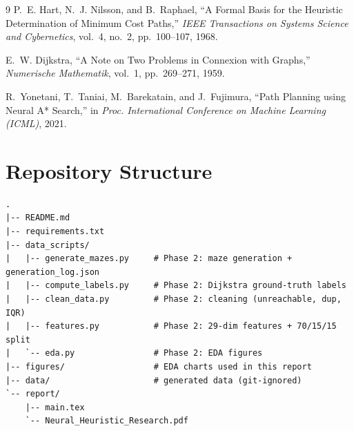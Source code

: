 \documentclass[11pt]{article}
\begin{document}
\begin{thebibliography}{9}
P.~E. Hart, N.~J. Nilsson, and B.~Raphael,
``A Formal Basis for the Heuristic Determination of Minimum Cost Paths,''
\emph{IEEE Transactions on Systems Science and Cybernetics}, vol.~4, no.~2, pp.~100--107, 1968.

E.~W. Dijkstra,
``A Note on Two Problems in Connexion with Graphs,''
\emph{Numerische Mathematik}, vol.~1, pp.~269--271, 1959.

R.~Yonetani, T.~Taniai, M.~Barekatain, and J.~Fujimura,
``Path Planning using Neural A* Search,''
in \emph{Proc. International Conference on Machine Learning (ICML)}, 2021.
\end{thebibliography}

\appendix


\section{Repository Structure}
\begin{verbatim}
.
|-- README.md
|-- requirements.txt
|-- data_scripts/
|   |-- generate_mazes.py     # Phase 2: maze generation + generation_log.json
|   |-- compute_labels.py     # Phase 2: Dijkstra ground-truth labels
|   |-- clean_data.py         # Phase 2: cleaning (unreachable, dup, IQR)
|   |-- features.py           # Phase 2: 29-dim features + 70/15/15 split
|   `-- eda.py                # Phase 2: EDA figures
|-- figures/                  # EDA charts used in this report
|-- data/                     # generated data (git-ignored)
`-- report/
    |-- main.tex
    `-- Neural_Heuristic_Research.pdf
\end{verbatim}
\end{document}
